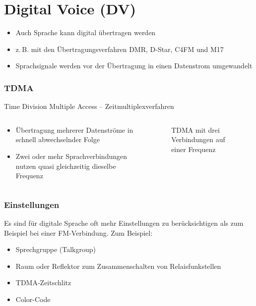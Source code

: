 
\section{Digital Voice (DV)}
\label{section:digital_voice}
\begin{frame}%
\begin{itemize}
  \item Auch Sprache kann digital übertragen werden
  \item z.\,B. mit den Übertragungsverfahren DMR, D-Star, C4FM und M17
  \item Sprachsignale werden vor der Übertragung in einen Datenstrom umgewandelt
  \end{itemize}
\end{frame}

\begin{frame}
\frametitle{TDMA}
Time Division Multiple Access -- Zeitmultiplexverfahren
\begin{columns}
    \begin{column}{0.48\textwidth}
    \begin{itemize}
  \item Übertragung mehrerer Datenströme in schnell abwechselnder Folge
  \item Zwei oder mehr Sprachverbindungen nutzen quasi gleichzeitig dieselbe Frequenz
  \end{itemize}

    \end{column}
   \begin{column}{0.48\textwidth}
       
\begin{figure}
    \caption{\scriptsize TDMA mit drei Verbindungen auf einer Frequenz}
    \label{n_digital_voice_tdma}
\end{figure}


   \end{column}
\end{columns}

\end{frame}

\begin{frame}
\frametitle{Einstellungen}
Es sind für digitale Sprache oft mehr Einstellungen zu berücksichtigen als zum Beispiel bei einer FM-Verbindung. Zum Beispiel:

\begin{itemize}
  \item Sprechgruppe (Talkgroup)
  \item Raum oder Reflektor zum Zusammenschalten von Relaisfunkstellen
  \item TDMA-Zeitschlitz
  \item Color-Code
  \end{itemize}
\end{frame}

